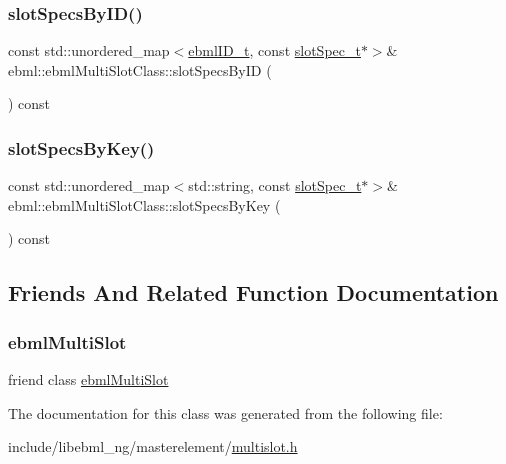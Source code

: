 \subsubsection{\texorpdfstring{slot\+Specs\+By\+I\+D()}{slotSpecsByID()}}
{\footnotesize\ttfamily const std\+::unordered\+\_\+map$<$\mbox{\hyperlink{namespaceebml_a86c5f604ddf12a74aa9812e997a58691}{ebml\+I\+D\+\_\+t}}, const \mbox{\hyperlink{classebml_1_1slotSpec__t}{slot\+Spec\+\_\+t}}$\ast$$>$\& ebml\+::ebml\+Multi\+Slot\+Class\+::slot\+Specs\+By\+ID (\begin{DoxyParamCaption}{ }\end{DoxyParamCaption}) const}

\mbox{\label{classebml_1_1ebmlMultiSlotClass_a57c1d13ad108cdd5b0cb0b717ef4ef92}} 
\subsubsection{\texorpdfstring{slot\+Specs\+By\+Key()}{slotSpecsByKey()}}
{\footnotesize\ttfamily const std\+::unordered\+\_\+map$<$std\+::string, const \mbox{\hyperlink{classebml_1_1slotSpec__t}{slot\+Spec\+\_\+t}}$\ast$$>$\& ebml\+::ebml\+Multi\+Slot\+Class\+::slot\+Specs\+By\+Key (\begin{DoxyParamCaption}{ }\end{DoxyParamCaption}) const}



\subsection{Friends And Related Function Documentation}
\mbox{\label{classebml_1_1ebmlMultiSlotClass_ab14eb6c5a125d7276a7b4b5b6573428b}} 
\subsubsection{\texorpdfstring{ebml\+Multi\+Slot}{ebmlMultiSlot}}
{\footnotesize\ttfamily friend class \mbox{\hyperlink{classebml_1_1ebmlMultiSlot}{ebml\+Multi\+Slot}}\hspace{0.3cm}{\ttfamily [friend]}}



The documentation for this class was generated from the following file\+:\begin{DoxyCompactItemize}
\item 
include/libebml\+\_\+ng/masterelement/\mbox{\hyperlink{multislot_8h}{multislot.\+h}}\end{DoxyCompactItemize}
